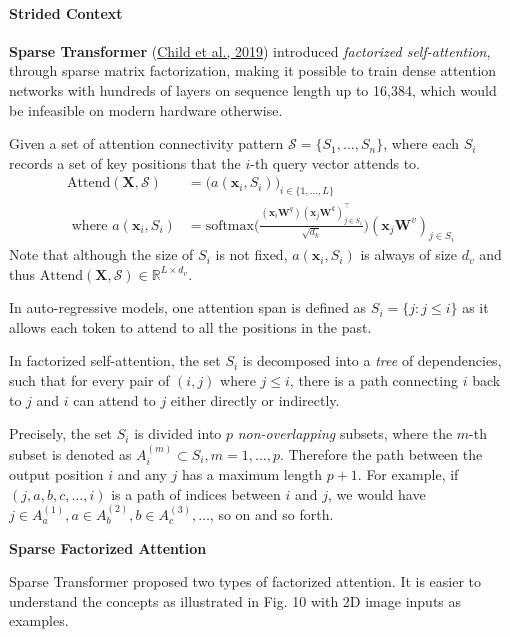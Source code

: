 \documentclass[12pt]{article}
\begin{document}
\paragraph{Strided Context}
\textbf{Sparse Transformer} (\href{https://arxiv.org/abs/1904.10509}{Child et al., 2019}) introduced \emph{factorized self-attention}, through sparse matrix factorization, making it possible to train dense attention networks with hundreds of layers on sequence length up to 16,384, which would be infeasible on modern hardware otherwise.

Given a set of attention connectivity pattern $\mathcal{S} = \{S_1, \dots, S_n\}$, where each $S_i$ records a set of key positions that the $i$-th query vector attends to.
\[
\begin{aligned}
\text{Attend}(\mathbf{X}, \mathcal{S}) &= \Big( a(\mathbf{x}_i, S_i) \Big)_{i \in \{1, \dots, L\}} \\
\text{ where } a(\mathbf{x}_i, S_i) &= \text{softmax}\Big(\frac{(\mathbf{x}_i \mathbf{W}^q)(\mathbf{x}_j \mathbf{W}^k)_{j \in S_i}^\top}{\sqrt{d_k}}\Big) (\mathbf{x}_j \mathbf{W}^v)_{j \in S_i}
\end{aligned}
\]
Note that although the size of $S_i$ is not fixed, $a(\mathbf{x}_i, S_i)$ is always of size $d_v$ and thus $\text{Attend}(\mathbf{X}, \mathcal{S}) \in \mathbb{R}^{L \times d_v}$.

In auto-regressive models, one attention span is defined as $S_i = \{j: j \leq i\}$ as it allows each token to attend to all the positions in the past.

In factorized self-attention, the set $S_i$ is decomposed into a \emph{tree} of dependencies, such that for every pair of $(i, j)$ where $j \leq i$, there is a path connecting $i$ back to $j$ and $i$ can attend to $j$ either directly or indirectly.

Precisely, the set $S_i$ is divided into $p$ \emph{non-overlapping} subsets, where the $m$-th subset is denoted as $A^{(m)}_i \subset S_i, m = 1,\dots, p$. Therefore the path between the output position $i$ and any $j$ has a maximum length $p + 1$. For example, if $(j, a, b, c, \dots, i)$ is a path of indices between $i$ and $j$, we would have $j \in A_a^{(1)}, a \in A_b^{(2)}, b \in A_c^{(3)}, \dots$, so on and so forth.

\textbf{Sparse Factorized Attention}

Sparse Transformer proposed two types of factorized attention. It is easier to understand the concepts as illustrated in Fig. 10 with 2D image inputs as examples.
\end{document}
